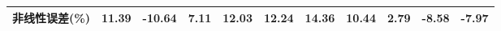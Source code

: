 \documentclass{myarticle}
\begin{document}
\begin{table}[!htbp]
\begin{tabular}[scale=0.7]{|l|llllllllll|}
		\rowcolor[rgb]{ .749,  .749,  .749} \textcolor[rgb]{ 0,  .439,  .753}{非线性误差(\%)} & \cellcolor[rgb]{ 1,  1,  1}11.39  & \cellcolor[rgb]{ 1,  1,  1}-10.64  & \cellcolor[rgb]{ 1,  1,  1}7.11  & \cellcolor[rgb]{ 1,  1,  1}12.03  & \cellcolor[rgb]{ 1,  1,  1}12.24  & \cellcolor[rgb]{ 1,  1,  1}14.36  & \cellcolor[rgb]{ 1,  1,  1}10.44  & \cellcolor[rgb]{ 1,  1,  1}2.79  & \cellcolor[rgb]{ 1,  1,  1}-8.58  & \cellcolor[rgb]{ 1,  1,  1}-7.97  \bigstrut[b]\\
		\hline
	\end{tabular}%
	\label{tab:addlabel}%
\end{table}%


	
\end{document}

